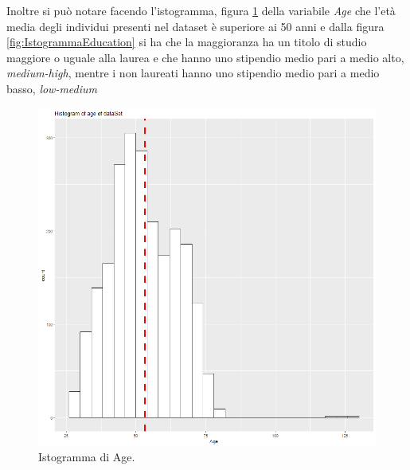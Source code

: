 \documentclass[letterpaper,11pt]{article}
\begin{document}
Inoltre si può notare facendo l'istogramma, figura \ref{fig:IstogrammaAge} della variabile \textit{Age} che l'età media degli individui presenti nel dataset è superiore ai 50 anni e dalla figura \ref{fig:IstogrammaEducation} si ha che la maggioranza ha un titolo di studio maggiore o uguale alla laurea e che hanno uno stipendio medio pari a medio alto, \textit{medium-high},  mentre i non laureati hanno uno stipendio medio pari a medio basso, \textit{low-medium}


\begin{figure}[H]
  \centering
  \begin{minipage}[b]{0.4\textwidth}
    \includegraphics[width=\textwidth]{Img/EDA/EDA005.png}
    \caption{Istogramma di Age.}
    \label{fig:IstogrammaAge}
  \end{minipage}
  \hfill
  \begin{minipage}[b]{0.4\textwidth}

\end{minipage}
\end{figure}
\end{document}
